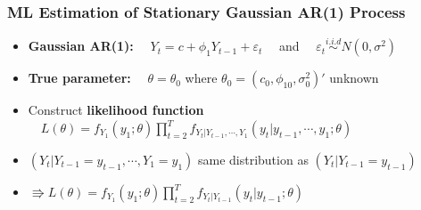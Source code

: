 \documentclass{beamer}
\begin{document}
	
	\begin{frame}
		\frametitle{ML Estimation of Stationary Gaussian AR(1) Process}
		\begin{itemize}
	
	\item[]  \textbf{Gaussian AR(1):} $\quad Y_t=c+\phi_{1} Y_{t-1}+ \varepsilon_t\quad $ and $\quad\varepsilon_t \overset{i.i.d}{\sim} N(0,\sigma^2)$
		\pause
	\vspace{19pt}
	
	\item[]   \textbf{True parameter:} $\quad \theta=\theta_0$ where $\theta_0=(c_0, \phi_{10}, \sigma_0^2)'$ unknown  
			\pause
	\vspace{25pt} 


	\item[] Construct \textbf{likelihood function} $\quad L(\theta)=f_{Y_1}(y_1;\theta) \displaystyle \prod_{t=2}^{T} f_{Y_t|Y_{t-1},\cdots,Y_1}(y_t| y_{t-1}, \cdots, y_1; \theta)$
	
			\pause
	\vspace{19pt} 
	
	\item[] \hspace{25pt} $(Y_{t}|Y_{t-1}=y_{t-1},\cdots, Y_1=y_1)$ same distribution as  $(Y_{t}|Y_{t-1}=y_{t-1})$  
			\pause
	\vspace{19pt} 
	
	\item[] \hspace{105pt} $\Rrightarrow L(\theta)=f_{Y_1}(y_1;\theta) \displaystyle \prod_{t=2}^{T} f_{Y_t|Y_{t-1}}(y_t|y_{t-1} ; \theta)$
\end{itemize}\end{frame}
\end{document}
